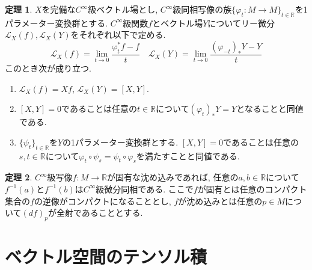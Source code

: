 \documentclass[dvipdfmx,a4paper,11pt]{article}
\newcommand{\R}{\mathbb{R}}
\theoremstyle{definition}
\newtheorem{thm}{定理}
\begin{document}
     \begin{tcolorbox}[
    colback = white,
    colframe = green!35!black,
    fonttitle = \bfseries,
    breakable = true]
    \begin{thm}
    \label{Lie_derivative}
$X$を完備な$C^{\infty}$級ベクトル場とし, $C^{\infty}$級同相写像の族$\{ \varphi_{t} : M \rightarrow M \}_{t \in \R}$を1パラメーター変換群とする.
      $C^{\infty}$級関数$f$とベクトル場$Y$についてリー微分$\mathcal{L}_{X}(f), \mathcal{L}_{X}(Y)$をそれぞれ以下で定める.
      $$
      \mathcal{L}_{X}(f) = \lim_{t \rightarrow 0}\frac{\varphi_{t}^{*} f-f}{t}
      \quad
        \mathcal{L}_{X}(Y) = \lim_{t \rightarrow 0}\frac{(\varphi_{-t})_{*} Y - Y}{t}
      $$
このとき次が成り立つ.
\begin{enumerate}
\setlength{\parskip}{0cm}
  \setlength{\itemsep}{2pt} 
\item $\mathcal{L}_{X}(f)  = Xf$, $\mathcal{L}_{X}(Y)=[X,Y]$.
\item $[X,Y]=0$であることは任意の$t \in \R$について$(\varphi_{t})_{*} Y =Y$となることと同値である.
\item $\{ \psi_{t} \}_{t \in \R}$を$Y$の1パラメーター変換群とする. $[X,Y]=0$であることは任意の$s,t \in \R$について$\varphi_{t} \circ \psi_{s} = \psi_{t} \circ \varphi_{s}$を満たすことと同値である.
\end{enumerate}

    \end{thm}
    \end{tcolorbox}
 
 
 

    \begin{tcolorbox}[
    colback = white,
    colframe = green!35!black,
    fonttitle = \bfseries,
    breakable = true]
\begin{thm}
$C^{\infty}$級写像$f : M\rightarrow \R$が固有な沈め込みであれば, 任意の$a,b \in \R$について$f^{-1}(a)$と$f^{-1}(b)$は$C^{\infty}$級微分同相である. 
ここで$f $が固有とは任意のコンパクト集合の$f$の逆像がコンパクトになることとし, $f$が沈め込みとは任意の$p \in M$について$(df)_{p}$が全射であることとする.
    \end{thm}
    \end{tcolorbox}



\section{ベクトル空間のテンソル積}
\label{sec-tensor}
\end{document}
